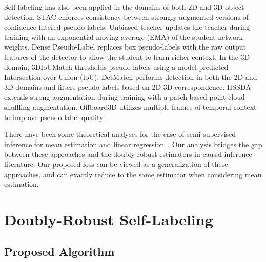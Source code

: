 Self-labeling has also been applied in the domains of both 2D \citep{liu2021unbiased,NEURIPS2019_d0f4dae8,Tang2021HumbleTT,sohn2020detection,zhou2022} and 3D \citep{park2022detmatch,wang20213dioumatch,li2023dds3d,liu2023hierarchical} object detection. STAC \cite{sohn2020detection} enforces consistency between strongly augmented versions of confidence-filtered pseudo-labels. Unbiased teacher \cite{liu2021unbiased} updates the teacher during training with an exponential moving average (EMA) of the student network weights. Dense Pseudo-Label \cite{zhou2022} replaces box pseudo-labels with the raw output features of the detector to allow the student to learn richer context. In the 3D domain, 3DIoUMatch \cite{wang20213dioumatch} thresholds pseudo-labels using a model-predicted Intersection-over-Union (IoU). DetMatch \cite{park2022detmatch} performs detection in both the 2D and 3D domains and filters pseudo-labels based on 2D-3D correspondence. HSSDA \cite{liu2023hierarchical} extends strong augmentation during training with a patch-based point cloud shuffling augmentation. Offboard3D \cite{qi2021offboard} utilizes multiple frames of temporal context to improve pseudo-label quality.

There have been some theoretical analyses for the case of semi-supervised inference for mean estimation and linear regression~\citep{zhang2019semi, azriel2022semi}. Our analysis bridges the gap between these approaches and the doubly-robust estimators in causal inference literature. Our proposed loss can be viewed as a generalization of these approaches, and can exactly reduce to the same estimator when considering mean estimation.

 

\section{Doubly-Robust Self-Labeling}
\subsection{Proposed Algorithm}

